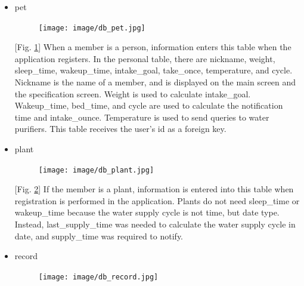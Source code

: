 \documentclass[conference]{IEEEtran}
\begin{document}
\begin{itemize}
\begin{enumerate}
\begin{itemize}
            [Fig. \ref{fig:db_person}] When a member is a person, information enters this table when the application registers. In the personal table, there are nickname, weight, sleep\_time, wakeup\_time, intake\_goal, take\_once, temperature, and cycle. Nickname is the name of a member, and is displayed on the main screen and the specification screen. Weight is used to calculate intake\_goal. Wakeup\_time, bed\_time, and cycle are used to calculate the notification time and intake\_ounce. Temperature is used to send queries to water purifiers. This table receives the user's id as a foreign key.
            \item pet
            \setlength{\parindent}{2ex}
            \par \begin{figure}[h!]
            \texttt{[image: image/db\_pet.jpg]}
            \centering
            \caption{}
            \label{fig:db_pet}
            \end{figure}
            
            [Fig. \ref{fig:db_pet}] When a member is a person, information enters this table when the application registers. In the personal table, there are nickname, weight, sleep\_time, wakeup\_time, intake\_goal, take\_once, temperature, and cycle. Nickname is the name of a member, and is displayed on the main screen and the specification screen. Weight is used to calculate intake\_goal. Wakeup\_time, bed\_time, and cycle are used to calculate the notification time and intake\_ounce. Temperature is used to send queries to water purifiers. This table receives the user's id as a foreign key.
            \item plant
            \setlength{\parindent}{2ex}
            \par \begin{figure}[h!]
            \texttt{[image: image/db\_plant.jpg]}
            \centering
            \caption{}
            \label{fig:db_plant}
            \end{figure}
            
            [Fig. \ref{fig:db_plant}] If the member is a plant, information is entered into this table when registration is performed in the application. Plants do not need sleep\_time or wakeup\_time because the water supply cycle is not time, but date type. Instead, last\_supply\_time was needed to calculate the water supply cycle in date, and supply\_time was required to notify.
            \item record
            \setlength{\parindent}{2ex}
            \par \begin{figure}[h!]
            \texttt{[image: image/db\_record.jpg]}
            \centering
            \caption{}
            \label{fig:db_record}
            \end{figure}
            

\end{itemize}
\end{enumerate}
\end{itemize}
\end{document}
